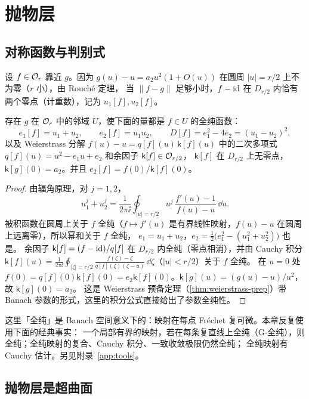 \section{抛物层}\label{ch9:sec:stratum}

\subsection{对称函数与判别式}
设 $f\in\mathcal O_r$ 靠近 $g$。因为 $g(u)-u=a_2u^2(1+O(u))$ 在圆周 $|u|=r/2$ 上不为零（$r$ 小），由 Rouché 定理，
当 $\|f-g\|$ 足够小时，$f-\mathrm{id}$ 在 $D_{r/2}$ 内恰有两个零点（计重数），记为 $u_1[f],u_2[f]$。

\begin{lemma}\label{ch9:lem:symmetric}
存在 $g$ 在 $\mathcal O_r$ 中的邻域 $U$，使下面的量都是 $f\in U$ 的全纯函数：
\[
 e_1[f]=u_1+u_2,\qquad e_2[f]=u_1u_2,\qquad D[f]=e_1^2-4e_2=(u_1-u_2)^2,
\]
以及 Weierstrass 分解 $f(u)-u=q[f](u)\,\mathsf k[f](u)$ 中的二次多项式 $q[f](u)=u^2-e_1u+e_2$ 和余因子 $\mathsf k[f]\in\mathcal O_{r/2}$，
$\mathsf k[f]$ 在 $D_{r/2}$ 上无零点，$\mathsf k[g](0)=a_2$。并且 $e_2[f]=f(0)/\mathsf k[f](0)$。
\end{lemma}

\begin{proof}
由辐角原理，对 $j=1,2$，
\[
 u_1^j+u_2^j=\frac1{2\pi\ii}\oint_{|u|=r/2}u^j\,\frac{f'(u)-1}{f(u)-u}\,\dd u .
\]
被积函数在圆周上关于 $f$ 全纯（$f\mapsto f'(u)$ 是有界线性映射，$f(u)-u$ 在圆周上远离零），所以幂和关于 $f$ 全纯，
$e_1=u_1+u_2$，$e_2=\tfrac12\bigl(e_1^2-(u_1^2+u_2^2)\bigr)$ 也是。
余因子 $\mathsf k[f]=(f-\mathrm{id})/q[f]$ 在 $D_{r/2}$ 内全纯（零点相消），并由 Cauchy 积分
$\mathsf k[f](u)=\frac1{2\pi\ii}\oint_{|\zeta|=r/2}\frac{f(\zeta)-\zeta}{q[f](\zeta)(\zeta-u)}\,\dd\zeta$（$|u|<r/2$）关于 $f$ 全纯。
在 $u=0$ 处 $f(0)=q[f](0)\mathsf k[f](0)=e_2\mathsf k[f](0)$。$\mathsf k[g](u)=(g(u)-u)/u^2$，故 $\mathsf k[g](0)=a_2$。
这是 Weierstrass 预备定理（\cref{thm:weierstrass-prep}）带 Banach 参数的形式，这里的积分公式直接给出了参数全纯性。
\end{proof}

这里「全纯」是 Banach 空间意义下的：映射在每点 Fr\'echet 复可微。本章反复使用下面的经典事实\cite[§§5--8]{Mujica1986}：
一个局部有界的映射，若在每条复直线上全纯（G-全纯），则全纯；全纯映射的复合、Cauchy 积分、一致收敛极限仍然全纯；
全纯映射有 Cauchy 估计。另见附录~\ref{app:tools}。

\subsection{抛物层是超曲面}

